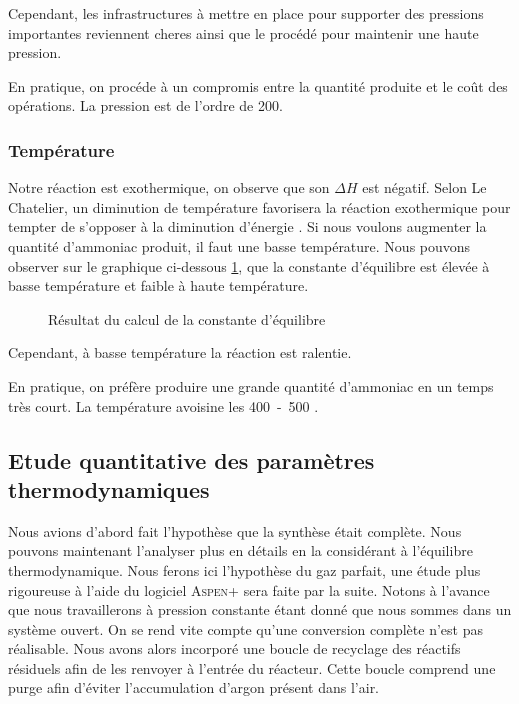 Cependant, les infrastructures à mettre en place pour supporter des pressions
importantes reviennent cheres ainsi que le procédé pour maintenir une haute pression.

En pratique, on procéde à un compromis entre la quantité produite et le coût des opérations.
La pression est de l'ordre de \unit{200}{\bbar}\cite{HaberB}.

\subsubsection{Température}
Notre réaction est exothermique, on observe que son $\Delta H$ est négatif.
Selon Le Chatelier, un diminution de température favorisera la réaction 
exothermique pour tempter de s'opposer à la diminution d'énergie \cite{LeChatelier}. 
Si nous voulons augmenter la quantité d'ammoniac produit, il faut une basse température.
Nous pouvons observer sur le graphique ci-dessous \ref{fig:constante d'équilibre}, que 
la constante d'équilibre est élevée à basse température et faible à haute température.

\begin{figure}
	\centering
	\caption{Résultat du calcul de la constante d'équilibre}
	\label{fig:constante d'équilibre}
\end{figure}

Cependant, à basse température la réaction est ralentie. 

En pratique, on préfère produire une grande quantité d'ammoniac en un temps très court. 
La température avoisine les \unit{400-500}{\degreecelsius} \cite{HaberB}.

\subsection{Etude quantitative des paramètres thermodynamiques }

Nous avions d'abord fait l'hypothèse que la synthèse était complète.
Nous pouvons maintenant l'analyser plus en détails en la considérant
à l'équilibre thermodynamique. Nous ferons ici l'hypothèse du gaz
parfait, une étude plus rigoureuse à l'aide du logiciel \textsc{Aspen+}
sera faite par la suite. Notons à l'avance que nous travaillerons
à pression constante étant donné que nous sommes dans un système ouvert.
On se rend vite compte qu'une conversion complète n'est pas réalisable. 
Nous avons alors incorporé une boucle de recyclage des réactifs résiduels
afin de les renvoyer à l'entrée du réacteur. Cette boucle comprend une 
purge afin d'éviter l'accumulation d'argon présent dans l'air. 

